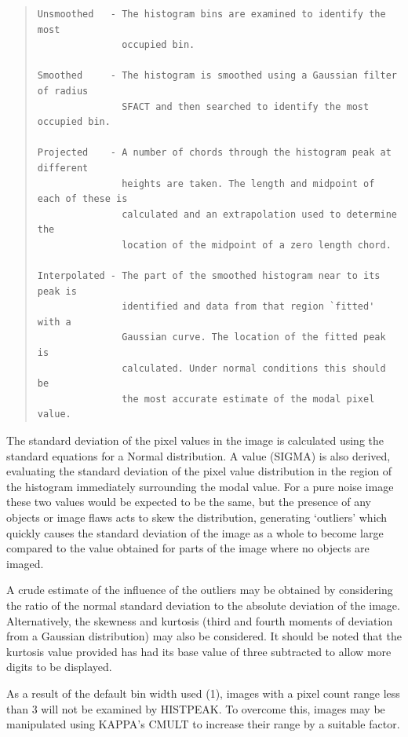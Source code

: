 \documentclass[twoside,11pt]{article}
\newcommand{\xref}[3]{#1}
\newenvironment{myquote}{\begin{quote}\begin{small}}{\end{small}\end{quote}}
\begin{document}
\begin{myquote}
\begin{verbatim}
Unsmoothed   - The histogram bins are examined to identify the most
               occupied bin.

Smoothed     - The histogram is smoothed using a Gaussian filter of radius
               SFACT and then searched to identify the most occupied bin.

Projected    - A number of chords through the histogram peak at different
               heights are taken. The length and midpoint of each of these is
               calculated and an extrapolation used to determine the 
               location of the midpoint of a zero length chord. 

Interpolated - The part of the smoothed histogram near to its peak is 
               identified and data from that region `fitted' with a 
               Gaussian curve. The location of the fitted peak is
               calculated. Under normal conditions this should be
               the most accurate estimate of the modal pixel value.
\end{verbatim}
\end{myquote}

The standard deviation of the pixel values in the image is
calculated using the standard equations for a Normal distribution. 
A value (SIGMA) is also derived, evaluating the standard deviation of the 
pixel value distribution in the region of the histogram immediately 
surrounding the 
modal value. For a pure noise image these two values would be expected
to be the same, but the presence of any objects or image flaws acts to
skew the distribution, generating `outliers' which quickly causes the
standard deviation of the image as a whole to become large compared to 
the value obtained for parts of the image where no objects are imaged.

A crude estimate of the influence of the outliers may be obtained by
considering the ratio of the normal standard deviation to the absolute 
deviation of the image. Alternatively, the skewness and kurtosis (third 
and fourth moments of deviation from a Gaussian distribution) may also be
considered. It should be noted that the kurtosis value provided 
has had its base value of three subtracted to allow more digits to be 
displayed.

As a result of the default bin width used (1), images with a pixel count range 
less than 3 will not be examined by HISTPEAK. To overcome this, images may be
manipulated using \xref{KAPPA}{sun95}{}'s CMULT to increase their range by a suitable factor.
\end{document}

